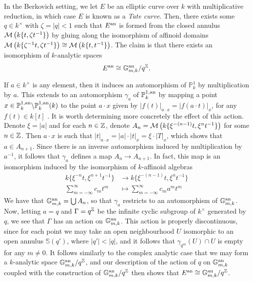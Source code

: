 In the Berkovich setting, we let $E$ be an elliptic curve over $k$ with multiplicative reduction, in which case $E$ is known as a \textit{Tate curve}.
Then, there exists some $q \in k^{\times}$ with $\zeta = |q| < 1$ such that $E^{\text{an}}$ is formed from the closed annulus $\mathcal{M}\left(k\{t, \zeta t^{-1}\}\right)$ by gluing along the isomorphism of affinoid domains $\mathcal{M}\left(k\{\zeta^{-1} t, \zeta t^{-1}\}\right) \cong \mathcal{M}\left(k\{t, t^{-1}\}\right)$.
The claim is that there exists an isomorphism of $k$-analytic spaces \[E^{\text{an}} \cong \mathbb{G}^{\text{an}}_{m, k}/q^{\mathbb{Z}}.\]

If $a \in k^{\times}$ is any element, then it induces an automorphism of $\mathbb{P}^{1}_{k}$ by multiplication by $a$.
This extends to an automorphism $\gamma_a$ of $\mathbb{P}^{1, \text{an}}_{k}$ by mapping a point $x \in \mathbb{P}^{1, \text{an}}_{k} \backslash \mathbb{P}^{1, \text{an}}_{k}(k)$ to the point $a \cdot x$ given by $|f(t)|_{a \cdot x} = |f(a \cdot t)|_x$, for any $f(t) \in k[t]$ \parencite[\S II1.3]{uniformization2}.
It is worth determining more concretely the effect of this action.
Denote $\xi = |a|$ and for each $n \in \mathbb{Z}$, denote $A_n = \mathcal{M}\left(k\{ \xi^{-(n - 1)} t, \xi^{n} t^{-1}\}\right)$ for some $n \in \mathbb{Z}$.
Then $a \cdot x$ is such that $|t|_{a \cdot x} = |a| \cdot |t|_x = \xi \cdot |T|_x$, which shows that $a \in A_{n + 1}$.
Since there is an inverse automorphism induced by multiplication by $a^{-1}$, it follows that $\gamma_a$ defines a map $A_n \to A_{n + 1}$.
In fact, this map is an isomorphism induced by the isomorphism of $k$-affinoid algebras
\begin{align*}
    k\{\xi^{-n} t, \xi^{n + 1} t^{-1} \} & \to k\{\xi^{-(n - 1)} t, \xi^{n} t^{-1} \} \\
    \sum_{m = -\infty}^{\infty} c_{m} t^{m} & \mapsto \sum_{m = -\infty}^{\infty} c_{m} a^m t^{m}
\end{align*}
We have that $\mathbb{G}^{\text{an}}_{m, k} = \bigcup A_{n}$, so that $\gamma_a$ restricts to an automorphism of $\mathbb{G}^{\text{an}}_{m, k}$.
Now, letting $a = q$ and $\Gamma = q^{\mathbb{Z}}$ be the infinite cyclic subgroup of $k^{\times}$ generated by $q$, we see that $\Gamma$ has an action on $\mathbb{G}^{\text{an}}_{m, k}$.
This action is properly discontinuous, since for each point we may take an open neighbourhood $U$ isomorphic to an open annulus $\mathbb{S}(q')$, where $|q'| < |q|$, and it follows that $\gamma_{q^m}(U) \cap U$ is empty for any $m \neq 0$.
It follows similarly to the complex analytic case that we may form a $k$-analytic space $\mathbb{G}^{\text{an}}_{m, k}/q^{\mathbb{Z}}$, and our description of the action of $q$ on $\mathbb{G}^{\text{an}}_{m, k}$ coupled with the construction of $\mathbb{G}^{\text{an}}_{m, k}/q^{\mathbb{Z}}$ then shows that $E^{\text{an}} \cong \mathbb{G}^{\text{an}}_{m, k}/q^{\mathbb{Z}}$.

